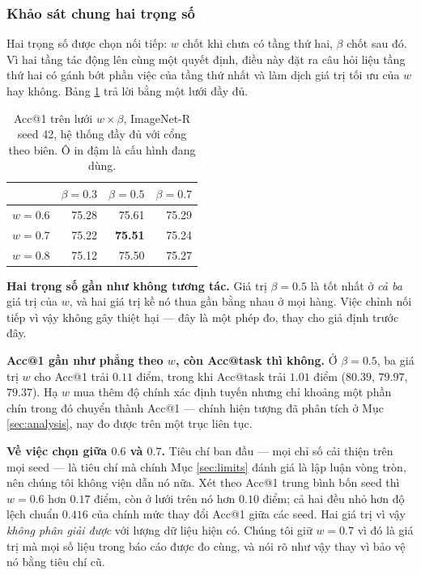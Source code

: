 \documentclass[11pt,a4paper]{article}
\begin{document}
\subsubsection{Khảo sát chung hai trọng số}

Hai trọng số được chọn nối tiếp: $w$ chốt khi chưa có tầng thứ hai, $\beta$ chốt
sau đó. Vì hai tầng tác động lên cùng một quyết định, điều này đặt ra câu hỏi
liệu tầng thứ hai có gánh bớt phần việc của tầng thứ nhất và làm dịch giá trị tối
ưu của $w$ hay không. Bảng \ref{tab:joint} trả lời bằng một lưới đầy đủ.

\begin{table}[htbp]
\centering
\caption{Acc@1 trên lưới $w \times \beta$, ImageNet-R seed 42, hệ thống đầy đủ
với cổng theo biên. Ô in đậm là cấu hình đang dùng.}
\label{tab:joint}
\begin{tabular}{@{}lrrr@{}}
\toprule
 & $\beta = 0.3$ & $\beta = 0.5$ & $\beta = 0.7$ \\
\midrule
$w = 0.6$ & 75.28 & 75.61 & 75.29 \\
$w = 0.7$ & 75.22 & \textbf{75.51} & 75.24 \\
$w = 0.8$ & 75.12 & 75.50 & 75.27 \\
\bottomrule
\end{tabular}
\end{table}

\textbf{Hai trọng số gần như không tương tác.} Giá trị $\beta = 0.5$ là tốt nhất
ở \emph{cả ba} giá trị của $w$, và hai giá trị kề nó thua gần bằng nhau ở mọi
hàng. Việc chỉnh nối tiếp vì vậy không gây thiệt hại --- đây là một phép đo, thay
cho giả định trước đây.

\textbf{Acc@1 gần như phẳng theo $w$, còn Acc@task thì không.} Ở $\beta = 0.5$,
ba giá trị $w$ cho Acc@1 trải $0.11$ điểm, trong khi Acc@task trải $1.01$ điểm
($80.39$, $79.97$, $79.37$). Hạ $w$ mua thêm độ chính xác định tuyến nhưng chỉ
khoảng một phần chín trong đó chuyển thành Acc@1 --- chính hiện tượng đã phân
tích ở Mục \ref{sec:analysis}, nay đo được trên một trục liên tục.

\textbf{Về việc chọn giữa $0.6$ và $0.7$.} Tiêu chí ban đầu --- mọi chỉ số cải
thiện trên mọi seed --- là tiêu chí mà chính Mục \ref{sec:limits} đánh giá là lập
luận vòng tròn, nên chúng tôi không viện dẫn nó nữa. Xét theo Acc@1 trung bình
bốn seed thì $w = 0.6$ hơn $0.17$ điểm, còn ở lưới trên nó hơn $0.10$ điểm; cả
hai đều nhỏ hơn độ lệch chuẩn $0.416$ của chính mức thay đổi Acc@1 giữa các seed.
Hai giá trị vì vậy \emph{không phân giải được} với lượng dữ liệu hiện có. Chúng
tôi giữ $w = 0.7$ vì đó là giá trị mà mọi số liệu trong báo cáo được đo cùng, và
nói rõ như vậy thay vì bảo vệ nó bằng tiêu chí cũ.
\end{document}

